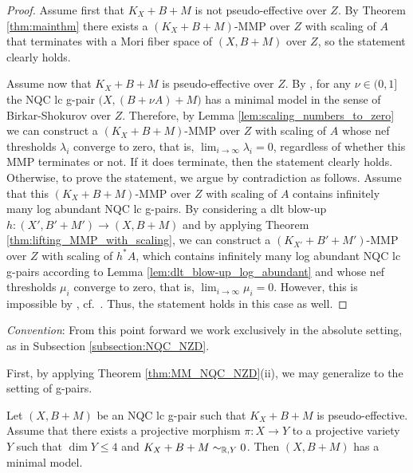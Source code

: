 	\begin{proof}
		Assume first that $K_X+B+M$ is not pseudo-effective over $ Z $. By Theorem \ref{thm:mainthm} there exists a $(K_X+B+M)$-MMP over $ Z $ with scaling of $A$ that terminates with a Mori fiber space of $ (X,B+M) $ over $ Z $, so the statement clearly holds.
		
		Assume now that $K_X+B+M$ is  pseudo-effective over $ Z $. By \cite[Theorem 1.2(1)]{LX22a}, for any $ \nu \in (0,1] $ the NQC lc g-pair $\big(X, (B+\nu A)+M \big)$ has a minimal model in the sense of Birkar-Shokurov over $ Z $. Therefore, by Lemma \ref{lem:scaling_numbers_to_zero} we can construct a $(K_X+B+M)$-MMP over $ Z $ with scaling of $A$ whose nef thresholds $ \lambda_i $ converge to zero, that is, $ \lim_{i \to \infty} \lambda_i = 0 $, regardless of whether this MMP terminates or not. If it does terminate, then the statement clearly holds. Otherwise, to prove the statement, we argue by contradiction as follows. Assume that this $(K_X+B+M)$-MMP over $ Z $ with scaling of $A$ contains infinitely many log abundant NQC lc g-pairs. By considering a dlt blow-up $ h \colon (X',B'+M') \to (X,B+M) $ and by applying Theorem \ref{thm:lifting_MMP_with_scaling}, we can construct a $(K_{X'}+B'+M')$-MMP over $Z$ with scaling of $ h^* A $, which contains infinitely many log abundant NQC lc g-pairs according to Lemma \ref{lem:dlt_blow-up_log_abundant} and whose nef thresholds $\mu_i$ converge to zero, that is, $\lim_{i \to \infty} \mu_i = 0 $. However, this is impossible by \cite[Theorem 7.6]{LX22a}, cf.\ \cite[Theorem 3.15]{Hash22a}. Thus, the statement holds in this case as well.
	\end{proof}
	
	\noindent \emph{Convention}: From this point forward we work exclusively in the absolute setting, as in Subsection \ref{subsection:NQC_NZD}.
	
	\medskip
	
	First, by applying Theorem \ref{thm:MM_NQC_NZD}(ii), we may generalize \cite[Lemma 3.11]{Hash20d} to the setting of g-pairs.
	
	\begin{lem}\label{lem:Hash20d_3.11}
		Let $(X,B+M)$ be an NQC lc g-pair such that $K_X+B+M$ is pseudo-effective. Assume that there exists a projective morphism $ \pi \colon X \to Y $ to a projective variety $ Y $ such that $ \dim Y \leq 4 $ and $K_X+B+M \sim_{\mathbb{R},Y} 0$. Then $(X,B+M)$ has a minimal model.
	\end{lem}
	
